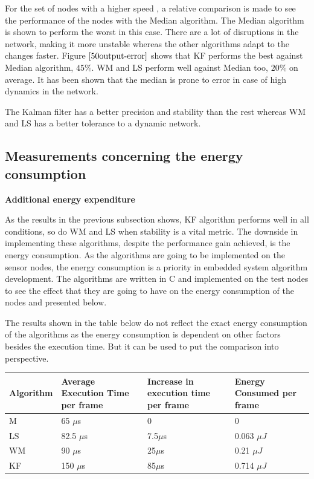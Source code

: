 \documentclass[journal]{IEEEtran}
\begin{document}
\par
For the set of nodes with a higher speed , a relative comparison is made to see the performance of the nodes with the Median algorithm. The Median algorithm is shown to perform the worst in this case. There are a lot of disruptions in the network, making it more unstable whereas the other algorithms adapt to the changes faster. Figure $\ref{50output-error}$ shows that KF performs the best against Median algorithm, $45\%$. WM and LS perform well against Median too, $20\%$ on average. It has been shown that the median is prone to error in case of high dynamics in the network.\par 
The Kalman filter has a better precision and stability than the rest whereas WM and LS has a better tolerance to a dynamic network.
\subsection{\textbf{Measurements concerning the energy consumption}}\noindent
\textbf{Additional energy expenditure}\par \noindent
As the results in the previous subsection shows, KF algorithm performs well in all conditions, so do WM and LS when stability is a vital metric. The downside in implementing these algorithms, despite the performance gain achieved, is the energy consumption. As the algorithms are going to be implemented on the sensor nodes, the energy consumption is a priority in embedded system algorithm development. The algorithms are written in C and implemented on the test nodes to see the effect that they are going to have on the energy consumption of the nodes and presented below. \par
The results shown in the table below do not reflect the exact energy consumption of the algorithms as the energy consumption is dependent on other factors besides the execution time. But it can be used to put the comparison into perspective. 
\begin{center}
    \begin{tabular}{ |p{1.5cm} | p{2cm} |p{2cm} |p{1.75cm} | }
    \hline \hline
    Algorithm & Average Execution Time per frame & Increase in execution time per frame & Energy Consumed per frame \\ \hline
    M &  65 $\mu$s & 0 & 0  \\ \hline
    LS & 82.5 $\mu$s & 7.5$\mu$s & 0.063 $\mu J$  \\ \hline
    WM &   90 $\mu$s & 25$\mu$s & 0.21 $\mu J$ \\ \hline
    KF &  150 $\mu$s  & 85$\mu$s &  0.714 $\mu J$\\ \hline
    \end{tabular}
\label{tab}
\end{center}
\end{document}
